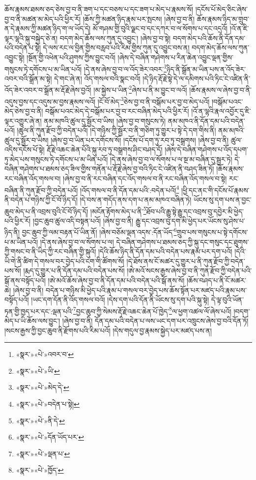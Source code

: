 ཆོས་རྣམས་ཐམས་ཅད་ཅེས་བྱ་བ་ནི་ཟག་པ་དང་བཅས་པ་དང་ཟག་པ་མེད་པ་རྣམས་སོ། །དངོས་པོ་མེད་ཅིང་ཞེས་བྱ་བ་ནི་མཚན་མ་མེད་པའི་ཕྱིར་རོ། །ཆོས་ཀྱི་མཚན་ཉིད་རྣམ་པར་སྤངས། །ཞེས་བྱ་བ་ནི། ཆོས་རྣམས་ཉིད་མ་གྲུབ་ན་དེ་རྣམས་ཀྱི་མཚན་ཉིད་ག་ལ་ཡོད་དེ། མོ་གཤམ་གྱི་བུའི་ལྗང་བ་དང་དཀར་བ་ལ་སོགས་པ་དང་འདྲའོ། །འོ་ན་ཇི་ལྟར་ལྷའི་སྐུ་བསྐྱེད་ཅེ་ན། བདག་མེད་ཆོས་ལས་ཀུན་དུ་འབྱུང་། །ཞེས་བྱ་བ་སྟེ། བདག་མེད་པའི་ཆོས་ནི་དོན་དམ་པའི་བདེན་པ་སྟེ། དེ་ལས་རང་ལ་བྱིན་གྱིས་བརླབ་པའི་རིམ་གྱིས་ཀུན་དུ་འབྱུང་བས་ན། བདག་མེད་ཆོས་ལས་ཀུན་འབྱུང་སྟེ། །སྔོན་གྱི་འཕེན་པའི་ཤུགས་ཀྱིས་བྱུང་བའོ། །ཞེས་དེ་བཞིན་གཤེགས་པ་རིན་ཆེན་འབྱུང་ལྡན་གྱིས་གསུངས་ཏེ་དགོངས་པ་མ་ཡིན་པའོ། །དེ་ནས་ཞེས་བྱ་བ་ལ་འོད་ཟེར་འབར་\footnote{«སྣར་»«པེ་»འབར་བ་}ཉིད་ནི་སྒྲོན་མ་ཡིན་པས་ན་འོད་ཟེར་འབར་བའི་སྒྲོན་མ་སྟེ། དེ་གང་ཞེ་ན། འོད་གསལ་བའི་སྣང་བའོ། །དེ་ཉིད་རྡོ་རྗེ་སྟེ་དེ་ལ་དམིགས་པའི་ཏིང་ངེ་འཛིན་ནི་འོད་ཟེར་འབར་བ་སྒྲོན་མ་རྡོ་རྗེ་ཞེས་བྱའོ། །མ་སྐྱེས་པ་ཡིན་\footnote{«སྣར་»«པེ་»ཡི་}ཞེས་པ་ནི་མ་བྱུང་བ་ལའོ། །ཆོས་རྣམས་ལ་ཞེས་བྱ་བ་ནི་འདུས་བྱས་དང་འདུས་མ་བྱས་རྣམས་ལའོ། །ངོ་བོ་མེད་\footnote{«སྣར་»«པེ་»མེད་དེ་}ཅེས་བྱ་བ་ནི་བསྒོམ་པར་བྱ་བ་མེད་པའོ། །བསྒོམ་པའང་མེད་ཅེས་བྱ་བ་ནི། བསྒོམ་པའང་མེད་དེ་བསྒོམ་པར་བྱ་བ་རང་བཞིན་མེད་པའི་ཕྱིར་རོ། །འོ་ན་ལྷའི་རྣལ་འབྱོར་དུ་ཇི་ལྟར་འགྱུར་ཞེ་ན། ནམ་མཁའི་ཚུལ་དུ་སྦྱོར་བ་ཡིས། །ཞེས་བྱ་བ་གསུངས་ཏེ། ནམ་མཁའ་ནི་དོན་དམ་པའི་བདེན་པའོ། །ཚུལ་ནི་ཀུན་རྫོབ་ཀྱི་བདེན་པའོ། །དེ་གཉིས་ཀྱི་སྦྱོར་བ་ནི་གཅིག་ཏུ་གྱུར་པ་སྟེ་དེ་དག་གིས་ནི། ནམ་མཁའི་ཚུལ་དུ་སྦྱོར་བ་ཡིས། །ཞེས་བྱ་བ་ཡིན་པར་དགོངས་སོ། །དངོས་པོ་དག་ཏུ་རབ་ཏུ་བསྒྲགས། །ཞེས་བྱ་བ་ནི། ཚུལ་འདིས་དངོས་པོ་སྟེ། རྡོ་རྗེ་འཆང་ཆེན་པོའི་སྐུ་རབ་ཏུ་བསྒྲགས་ཤིང་བཤད་དོ། །ཞེས་དེ་བཞིན་གཤེགས་པ་འོད་དཔག་ཏུ་མེད་པས་གསུངས་ཏེ་དགོངས་པ་མ་ཡིན་པའོ། །དེ་ནས་ཞེས་བྱ་བ་ལ་སོགས་པ་ལ་སྔ་མ་བཞིན་དུ་སྦྱར་ཏེ། དེ་བཞིན་གཤེགས་པ་ཐམས་ཅད་ཟིལ་གྱིས་གནོན་པ་རྡོ་རྗེ་ཞེས་བྱ་བའི་ཏིང་ངེ་འཛིན་ནི་བཤད་ཟིན་ཏོ། །ཆོས་རྣམས་རང་བཞིན་འོད་གསལ་བ། །ཞེས་བྱ་བ་ནི་རང་བཞིན་དང་འོད་གསལ་བ་ནི་རང་བཞིན་འོད་གསལ་བ་སྟེ། རང་བཞིན་ནི་ཀུན་རྫོབ་ཀྱི་བདེན་པའོ། །འོད་གསལ་བ་ནི་དོན་དམ་པའི་:བདེན་པའོ།\footnote{«སྣར་»«པེ་»བདེན་པ་སྟེ།} །ཕྱི་དང་ནང་གི་དངོས་པོ་རྣམས་ནི་བདེན་པ་གཉིས་ཀྱི་ངོ་བོ་ཉིད་དོ། །དེ་བས་ན་གདོད་ནས་དག་པ་ནམ་མཁའ་བཞིན་ཏེ། ཡོངས་སུ་དག་པས་ན་བྱང་ཆུབ་མེད་པ་ནི་འབྲས་བུའི་ངོ་བོ་ཉིད་དོ། །མངོན་རྟོགས་མེད་པ་ནི་\footnote{«སྣར་»«པེ་»ནི་དེ་}ཐོབ་པའི་རྒྱུ་སྟེ་རྒྱུ་དང་འབྲས་བུ་དབྱེར་མི་ཕྱེད་པའི་ཕྱིར་རོ། །བྱང་ཆུབ་ཚུལ་འདི་བསྟན་པའོ། །ཞེས་བྱ་བ་ནི། རྒྱུ་དང་འབྲས་བུ་དག་མི་ཕྱེད་པར་ཡོངས་སུ་ཤེས་པ་ཉིད་ནི། བྱང་ཆུབ་ཀྱི་ལམ་བརྟན་པོ་ཡིན་ནོ། །ཞེས་བཅོམ་ལྡན་འདས་:དོན་ཡོད་\footnote{«སྣར་»«པེ་»དོན་ཡོད་པར་}གྲུབ་པས་གསུངས་པ་སྟེ་དགོངས་པ་མ་ཡིན་པའོ། །དེ་ནས་ཞེས་བྱ་བ་ལ་སོགས་པ་ལ། དེ་བཞིན་གཤེགས་པ་ཐམས་ཅད་ཀྱི་སྐུ་དང་གསུང་དང་ཐུགས་ཀྱི་གསང་བ་ནི་ཡིད་ཀྱི་རང་བཞིན་གྱི་སྐུའོ། །དེའི་ཆོས་ཉིད་ནི་དོན་དམ་པའི་བདེན་པས་རྣམ་པར་དག་པའོ། །དེའི་ཡི་གེ་ནི་ཚིག་དེ་གསལ་བར་བྱེད་པའི་ངག་གི་ཚོགས་སོ། །དེ་ཐོས་ནས་ངོ་མཚར་དུ་གྱུར་པ་ནི་ཀུན་རྫོབ་ཀྱི་བདེན་པས་སོ། །རྨད་དུ་གྱུར་པ་ནི་དོན་དམ་པའི་བདེན་པས་སོ། །ཨེ་མའོ་སངས་རྒྱས་ཞེས་བྱ་བ་ནི་ཀུན་རྫོབ་ཀྱི་བདེན་པའི་སྒོ་ནས་བསྟོད་པའོ། །ཨེ་མའོ་ཆོས་ཞེས་བྱ་བ་ནི་དོན་དམ་པའི་བདེན་པའི་སྒོ་ནས་སོ། །ཆོས་བཤད་པ་ནི་ངོ་མཚར་ཆེ། །ཞེས་བྱ་བ་ནི། བདེན་པ་གཉིས་མི་ཕྱེད་པའི་རྣམ་པ་གསལ་བར་བྱེད་པས་ཆོས་སྟོན་པར་མཛད་པའི་རྣམ་པས་བསྟོད་པའོ། །ཡང་དག་དོན་ནི་འོད་གསལ་བའོ། །དེས་དག་པའི་དོན་ནི་ཡོངས་སུ་དག་པའི་སྐུ་སྟེ། དེ་ལྟ་བུའི་ཡོན་ཏན་གྱི་ཁྱད་པར་དང་:ལྡན་པའི་\footnote{«སྣར་»«པེ་»ལྡན་པ་}བྱང་ཆུབ་ཀྱི་སེམས་རྡོ་རྗེ་འཆང་ཆེན་པོ་ཁྱེད་\footnote{«སྣར་»«པེ་»ཁྱོད་}ལ་ཕྱག་འཚལ་ལོ་ཞེས་པའོ། །བདག་མེད་པ་ཡི་ཆོས་ལས་བྱུང་། །ཞེས་བྱ་བ་ནི། དོན་དམ་པའི་བདེན་པ་ལས་ཡང་དག་པར་འཁྲུངས་ཞེས་བྱ་བའི་དོན་ཏོ། །སངས་རྒྱས་ཀྱི་བྱང་ཆུབ་ནི་རྫོགས་པའི་རིམ་པའོ། །དེས་གདུལ་བྱ་རྣམས་སྐྱེད་པར་མཛད་པས་ན། 